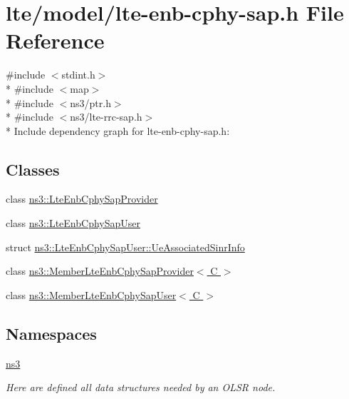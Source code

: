 \hypertarget{lte-enb-cphy-sap_8h}{}\section{lte/model/lte-\/enb-\/cphy-\/sap.h File Reference}
\label{lte-enb-cphy-sap_8h}
{\ttfamily \#include $<$stdint.\+h$>$}\\*
{\ttfamily \#include $<$map$>$}\\*
{\ttfamily \#include $<$ns3/ptr.\+h$>$}\\*
{\ttfamily \#include $<$ns3/lte-\/rrc-\/sap.\+h$>$}\\*
Include dependency graph for lte-\/enb-\/cphy-\/sap.h\+:
\subsection*{Classes}
\begin{DoxyCompactItemize}
\item 
class \hyperlink{classns3_1_1LteEnbCphySapProvider}{ns3\+::\+Lte\+Enb\+Cphy\+Sap\+Provider}
\item 
class \hyperlink{classns3_1_1LteEnbCphySapUser}{ns3\+::\+Lte\+Enb\+Cphy\+Sap\+User}
\item 
struct \hyperlink{structns3_1_1LteEnbCphySapUser_1_1UeAssociatedSinrInfo}{ns3\+::\+Lte\+Enb\+Cphy\+Sap\+User\+::\+Ue\+Associated\+Sinr\+Info}
\item 
class \hyperlink{classns3_1_1MemberLteEnbCphySapProvider}{ns3\+::\+Member\+Lte\+Enb\+Cphy\+Sap\+Provider$<$ C $>$}
\item 
class \hyperlink{classns3_1_1MemberLteEnbCphySapUser}{ns3\+::\+Member\+Lte\+Enb\+Cphy\+Sap\+User$<$ C $>$}
\end{DoxyCompactItemize}
\subsection*{Namespaces}
\begin{DoxyCompactItemize}
\item 
 \hyperlink{namespacens3}{ns3}
\begin{DoxyCompactList}\small\item\em Here are defined all data structures needed by an O\+L\+SR node. \end{DoxyCompactList}\end{DoxyCompactItemize}
